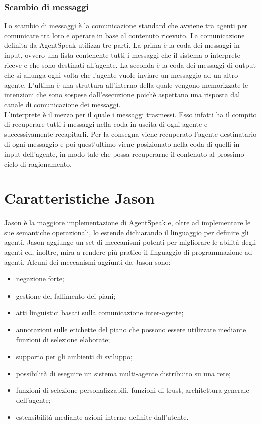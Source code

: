 \subsubsection{Scambio di messaggi}
Lo scambio di messaggi \`e la comunicazione standard che avviene tra agenti per comunicare tra loro e operare in base al contenuto ricevuto.
La comunicazione definita da AgentSpeak utilizza tre parti. La prima \`e la coda dei messaggi in input, ovvero una lista contenente tutti i messaggi che il sistema o interprete riceve e che sono destinati all'agente. La seconda \`e la coda dei messaggi di output che si allunga ogni volta che l'agente vuole inviare un messaggio ad un altro agente. L'ultima \`e una struttura all'interno della quale vengono memorizzate le intenzioni che sono sospese dall'esecuzione poich\`e aspettano una risposta dal canale di comunicazione dei messaggi.
\\
L'interprete \`e il mezzo per il quale i messaggi trasmessi. Esso infatti ha il compito di recuperare tutti i messaggi nella coda in uscita di ogni agente e successivamente recapitarli. Per la consegna viene recuperato l'agente destinatario di ogni messaggio e poi quest'ultimo viene posizionato nella coda di quelli in input dell'agente, in modo tale che possa recuperarne il contenuto al prossimo ciclo di ragionamento.

\section{Caratteristiche Jason}
Jason \`e la maggiore implementazione di AgentSpeak e, oltre ad implementare le sue semantiche operazionali, lo estende dichiarando il linguaggio per definire gli agenti. Jason aggiunge un set di meccanismi potenti per migliorare le abilit\`a degli agenti ed, inoltre, mira a rendere pi\`u pratico il linguaggio di programmazione ad agenti. Alcuni dei meccanismi aggiunti da Jason sono:
\begin{itemize}
\item negazione forte;
\item gestione del fallimento dei piani;
\item atti linguistici basati sulla comunicazione inter-agente;
\item annotazioni sulle etichette del piano che possono essere utilizzate mediante funzioni di selezione elaborate;
\item supporto per gli ambienti di sviluppo;
\item possibilit\`a di eseguire un sistema multi-agente distribuito su una rete;
\item funzioni di selezione personalizzabili, funzioni di trust, architettura generale dell'agente;
\item estensibilit\`a mediante azioni interne definite dall'utente.
\end{itemize}

